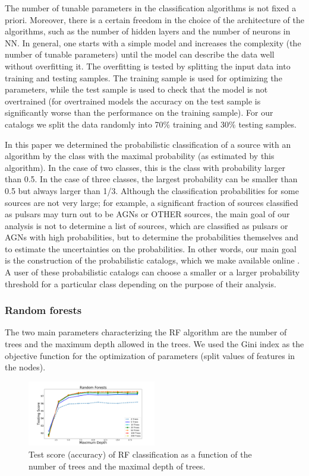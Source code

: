 \documentclass[referee]{aa} %
\newcommand{\lb}{\label}
\begin{document}
The number of tunable parameters in the classification algorithms is not fixed a priori. 
Moreover, there is a certain freedom in the choice of the architecture of the algorithms, such as
the number of hidden layers and the number of neurons in NN.
In general, one starts with a simple model and increases the complexity (the number of tunable parameters)
until the model can describe the data well without overfitting it.
The overfitting is tested by splitting the input data into training and testing samples.
The training sample is used for optimizing the parameters,
while the test sample is used to check that the model is not overtrained (for overtrained models the accuracy on the test
sample is significantly worse than the performance on the training sample).
For our catalogs we split the data randomly into 70\% training and 30\% testing samples.

In this paper we determined the probabilistic classification of a source with an algorithm by the class with the maximal probability (as estimated by this algorithm). In the case of two classes, this is the class with probability larger than 0.5. In the case of three classes, the largest probability can be smaller than 0.5 but always larger than 1/3. Although the classification probabilities for some sources are not very large; for example, a significant fraction of sources classified as pulsars may turn out to be AGNs or OTHER sources, the main goal of our analysis is not to determine a list of sources, which are classified as pulsars or AGNs with high probabilities, but to determine the probabilities themselves and to estimate the uncertainties on the probabilities. In other words, our main goal is the construction of the probabilistic catalogs, which we make available online \citep{SOM_material}. A user of these probabilistic catalogs can choose a smaller or a larger probability threshold for a particular class depending on the purpose of their analysis.


\subsubsection{Random forests}
\lb{sec:rf}

The two main parameters characterizing the RF algorithm are the number of trees and the maximum depth allowed in the trees. 
We used the Gini index as the objective function for the optimization of parameters (split values of features in the nodes).

\begin{figure}[h]
\centering
\includegraphics[width=0.5\textwidth]{plots/rf_train_assocnewfeats.pdf}
\caption{
Test score (accuracy) of RF classification as a function of the number of trees and 
the maximal depth of trees.
}
\label{fig:RF_complexity}
\end{figure}
\end{document}
